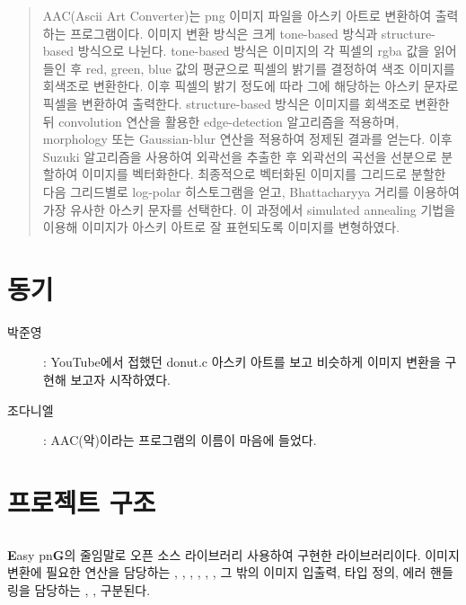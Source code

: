 \documentclass[conference]{IEEEtran}
\begin{document}
\maketitle

\begin{abstract}
AAC(Ascii Art Converter)는 png 이미지 파일을 아스키 아트로 변환하여 출력하는 프로그램이다.
이미지 변환 방식은 크게 tone-based 방식과 structure-based 방식으로 나뉜다.
tone-based 방식은 이미지의 각 픽셀의 rgba 값을 읽어들인 후 red, green, blue 값의 평균으로 픽셀의 밝기를 결정하여 색조 이미지를 회색조로 변환한다.
이후 픽셀의 밝기 정도에 따라 그에 해당하는 아스키 문자로 픽셀을 변환하여 출력한다.
structure-based 방식은 이미지를 회색조로 변환한 뒤 convolution 연산을 활용한 edge-detection 알고리즘을 적용하며, morphology 또는 Gaussian-blur 연산을 적용하여 정제된 결과를 얻는다.
이후 Suzuki 알고리즘을 사용하여 외곽선을 추출한 후 외곽선의 곡선을 선분으로 분할하여 이미지를 벡터화한다.
최종적으로 벡터화된 이미지를 그리드로 분할한 다음 그리드별로 log-polar 히스토그램을 얻고, Bhattacharyya 거리를 이용하여 가장 유사한 아스키 문자를 선택한다.
이 과정에서 simulated annealing 기법을 이용해 이미지가 아스키 아트로 잘 표현되도록 이미지를 변형하였다.
\end{abstract}

\section{동기}
\begin{description}
    \item[박준영]: YouTube에서 접했던 donut.c 아스키 아트를 보고 비슷하게 이미지 변환을 구현해 보고자 시작하였다.\cite{donut}
    \item[조다니엘]\hspace{1em}: AAC(악)이라는 프로그램의 이름이 마음에 들었다.
\end{description}

\section{프로젝트 구조}

\subsection{\eg}

 \textbf{E}asy pn\textbf{G}의 줄임말로 오픈 소스 라이브러리   사용하여 구현한 라이브러리이다.
 이미지 변환에 필요한 연산을 담당하는 \egGeometry, \egMath, \egMethods, \egOperators, \egProcessing, \egTrace,  그 밖의 이미지 입출력, 타입 정의, 에러 핸들링을 담당하는 \egLoader, \egTypes,  구분된다.
\end{document}
